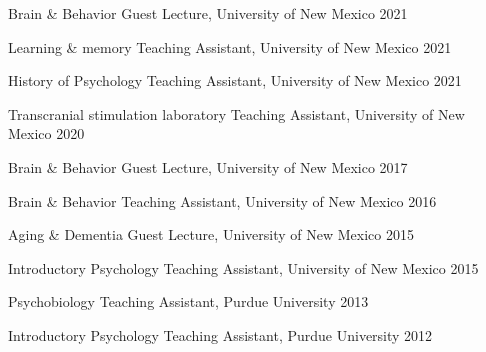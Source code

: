 
\begin{cvhonors}
  \cvhonor
    {Brain \& Behavior} %
    {Guest Lecture, University of New Mexico} %
    {} %
    {2021} %
    
  \cvhonor
    {Learning \& memory} %
    {Teaching Assistant, University of New Mexico} %
    {} %
    {2021} %
    
  \cvhonor
    {History of Psychology} %
    {Teaching Assistant, University of New Mexico} %
    {} %
    {2021} %
    
  \cvhonor
    {Transcranial stimulation laboratory} %
    {Teaching Assistant, University of New Mexico} %
    {} %
    {2020} %
    
  \cvhonor
    {Brain \& Behavior} %
    {Guest Lecture, University of New Mexico} %
    {} %
    {2017} %
    
  \cvhonor
    {Brain \& Behavior} %
    {Teaching Assistant, University of New Mexico} %
    {} %
    {2016} %

  \cvhonor
    {Aging \& Dementia} %
    {Guest Lecture, University of New Mexico} %
    {} %
    {2015} %
    
  \cvhonor
    {Introductory Psychology} %
    {Teaching Assistant, University of New Mexico} %
    {} %
    {2015} %
    
  \cvhonor
    {Psychobiology} %
    {Teaching Assistant, Purdue University} %
    {} %
    {2013} %

  \cvhonor
    {Introductory Psychology} %
    {Teaching Assistant, Purdue University} %
    {} %
    {2012} %
\end{cvhonors}    